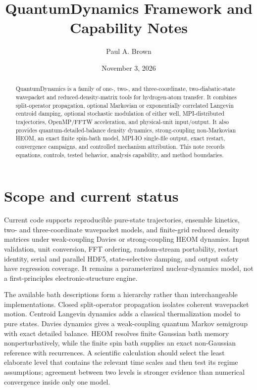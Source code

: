 \documentclass[11pt]{article}
\title{QuantumDynamics Framework and Capability Notes}
\author{Paul A. Brown}
\date{November 3, 2026}
\begin{document}
\maketitle

\begin{abstract}
QuantumDynamics is a family of one-, two-, and three-coordinate, two-diabatic-state
wavepacket and reduced-density-matrix tools for hydrogen-atom transfer. It combines
split-operator propagation, optional Markovian or exponentially correlated
Langevin centroid damping, optional stochastic modulation of either well,
MPI-distributed trajectories, OpenMP/FFTW acceleration, and physical-unit
input/output. It also provides quantum-detailed-balance density dynamics,
strong-coupling non-Markovian HEOM, an exact finite spin-bath model,
MPI-IO single-file output, exact restart,
convergence campaigns, and controlled mechanism attribution. This note records
equations, controls, tested behavior, analysis capability, and method boundaries.
\end{abstract}

\begingroup
\scriptsize
\setlength{\parskip}{0pt}
\tableofcontents
\endgroup
\newpage

\section{Scope and current status}

Current code supports reproducible pure-state trajectories, ensemble kinetics,
two- and three-coordinate wavepacket models, and finite-grid reduced density matrices under
weak-coupling Davies or strong-coupling HEOM dynamics.
Input validation, unit conversion, FFT ordering, random-stream portability,
restart identity, serial and parallel HDF5, state-selective damping, and output
safety have regression coverage. It remains a parameterized nuclear-dynamics
model, not a first-principles electronic-structure engine.

The available bath descriptions form a hierarchy rather than interchangeable
implementations. Closed split-operator propagation isolates coherent wavepacket
motion. Centroid Langevin dynamics adds a classical thermalization model to pure
states. Davies dynamics gives a weak-coupling quantum Markov semigroup with exact
detailed balance. HEOM resolves finite Gaussian bath memory nonperturbatively, while
the finite spin bath supplies an exact non-Gaussian reference with recurrences. A
scientific calculation should select the least elaborate level that contains the
relevant time scales and then test its regime assumptions; agreement between two
levels is stronger evidence than numerical convergence inside only one model.
\end{document}

